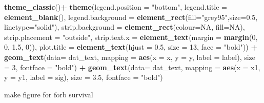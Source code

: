 \documentclass[
]{article}
\newenvironment{Shaded}{\begin{snugshade}}{\end{snugshade}}
\newcommand{\DataTypeTok}[1]{\textcolor[rgb]{0.13,0.29,0.53}{#1}}
\newcommand{\DecValTok}[1]{\textcolor[rgb]{0.00,0.00,0.81}{#1}}
\newcommand{\FloatTok}[1]{\textcolor[rgb]{0.00,0.00,0.81}{#1}}
\newcommand{\KeywordTok}[1]{\textcolor[rgb]{0.13,0.29,0.53}{\textbf{#1}}}
\newcommand{\NormalTok}[1]{#1}
\newcommand{\OperatorTok}[1]{\textcolor[rgb]{0.81,0.36,0.00}{\textbf{#1}}}
\newcommand{\OtherTok}[1]{\textcolor[rgb]{0.56,0.35,0.01}{#1}}
\newcommand{\StringTok}[1]{\textcolor[rgb]{0.31,0.60,0.02}{#1}}
\begin{document}
\begin{Shaded}
\begin{Highlighting}[]
\StringTok{  }\KeywordTok{theme\_classic}\NormalTok{()}\OperatorTok{+}
\StringTok{  }\KeywordTok{theme}\NormalTok{(}\DataTypeTok{legend.position =} \StringTok{"bottom"}\NormalTok{, }\DataTypeTok{legend.title =} \KeywordTok{element\_blank}\NormalTok{(), }\DataTypeTok{legend.background =} \KeywordTok{element\_rect}\NormalTok{(}\DataTypeTok{fill=}\StringTok{"grey95"}\NormalTok{,}\DataTypeTok{size=}\FloatTok{0.5}\NormalTok{, }\DataTypeTok{linetype=}\StringTok{"solid"}\NormalTok{), }\DataTypeTok{strip.background =} \KeywordTok{element\_rect}\NormalTok{(}\DataTypeTok{colour=}\OtherTok{NA}\NormalTok{, }\DataTypeTok{fill=}\OtherTok{NA}\NormalTok{), }\DataTypeTok{strip.placement =} \StringTok{"outside"}\NormalTok{, }\DataTypeTok{strip.text.x =} \KeywordTok{element\_text}\NormalTok{(}\DataTypeTok{margin =} \KeywordTok{margin}\NormalTok{(}\DecValTok{0}\NormalTok{, }\DecValTok{0}\NormalTok{, }\FloatTok{1.5}\NormalTok{, }\DecValTok{0}\NormalTok{)), }\DataTypeTok{plot.title =} \KeywordTok{element\_text}\NormalTok{(}\DataTypeTok{hjust =} \FloatTok{0.5}\NormalTok{, }\DataTypeTok{size =} \DecValTok{13}\NormalTok{, }\DataTypeTok{face =} \StringTok{"bold"}\NormalTok{)) }\OperatorTok{+}
\StringTok{  }\KeywordTok{geom\_text}\NormalTok{(}\DataTypeTok{data=}\NormalTok{ dat\_text, }\DataTypeTok{mapping =} \KeywordTok{aes}\NormalTok{(}\DataTypeTok{x =}\NormalTok{ x, }\DataTypeTok{y =}\NormalTok{ y, }\DataTypeTok{label =}\NormalTok{ label), }\DataTypeTok{size =} \DecValTok{3}\NormalTok{, }\DataTypeTok{fontface =} \StringTok{"bold"}\NormalTok{) }\OperatorTok{+}
\StringTok{  }\KeywordTok{geom\_text}\NormalTok{(}\DataTypeTok{data=}\NormalTok{ dat\_text, }\DataTypeTok{mapping =} \KeywordTok{aes}\NormalTok{(}\DataTypeTok{x =}\NormalTok{ x1, }\DataTypeTok{y =}\NormalTok{ y1, }\DataTypeTok{label =}\NormalTok{ sig), }\DataTypeTok{size =} \FloatTok{3.5}\NormalTok{, }\DataTypeTok{fontface =} \StringTok{"bold"}\NormalTok{)}
\end{Highlighting}
\end{Shaded}

make figure for forb survival
\end{document}
